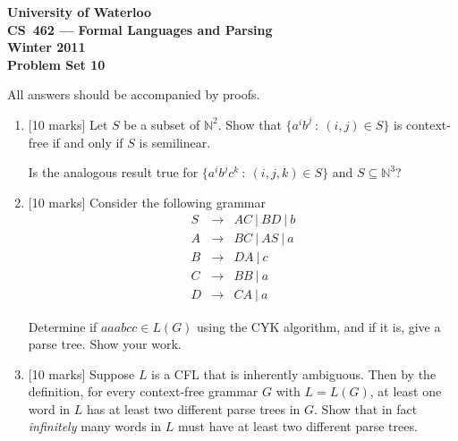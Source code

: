 \documentclass[12pt]{article}
\def\Enn{{\mathbb N}}
\begin{document}
\begin{center}
\large\bf University of Waterloo\\
CS~462 --- Formal Languages and Parsing\\
Winter 2011\\
Problem Set 10\\
\end{center}

\bigskip


\smallskip


\bigskip\bigskip

All answers should be accompanied by proofs.

\begin{enumerate}

\item{} [10 marks]  
Let $S$ be a subset of $\Enn^2$.
Show that $\{a^i b^j \ : \ (i,j) \in S \}$ is context-free if and only
if $S$ is semilinear.

Is the analogous result true for $\{ a^i b^j c^k \ : \ (i,j,k) \in S \}$
and $S \subseteq \Enn^3$?

\bigskip

\item{} [10 marks] 
Consider the following grammar
\begin{eqnarray*}
S & \rightarrow & A C \ | \ B D \ | \ b \\
A & \rightarrow &  B C \ | \ A S \ | \ a \\
B & \rightarrow &  D A \ | \  c \\
C & \rightarrow &  B B \ | \ a \\
D & \rightarrow &  C A \ | \ a
\end{eqnarray*}

Determine if $aaabcc \in L(G)$ using the CYK algorithm, and
if it is, give a parse tree.  Show your work.

\bigskip

\item{} [10 marks]  
Suppose $L$ is a CFL that is inherently ambiguous.  Then by the definition,
for every
context-free grammar $G$ with $L = L(G)$, at least one word in $L$ has at
least two different parse trees in $G$.
Show that in fact {\it infinitely}
many words in $L$ must have at least two different parse trees.

\end{enumerate}
\end{document}
